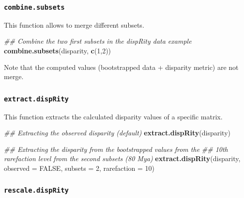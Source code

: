\documentclass[]{book}
\newenvironment{Shaded}{\begin{snugshade}}{\end{snugshade}}
\newcommand{\CommentTok}[1]{\textcolor[rgb]{0.56,0.35,0.01}{\textit{#1}}}
\newcommand{\DataTypeTok}[1]{\textcolor[rgb]{0.13,0.29,0.53}{#1}}
\newcommand{\DecValTok}[1]{\textcolor[rgb]{0.00,0.00,0.81}{#1}}
\newcommand{\KeywordTok}[1]{\textcolor[rgb]{0.13,0.29,0.53}{\textbf{#1}}}
\newcommand{\NormalTok}[1]{#1}
\newcommand{\OtherTok}[1]{\textcolor[rgb]{0.56,0.35,0.01}{#1}}
\begin{document}
\hypertarget{combine.subsets}{%
\subsubsection{\texorpdfstring{\texttt{combine.subsets}}{combine.subsets}}\label{combine.subsets}}

This function allows to merge different subsets.

\begin{Shaded}
\begin{Highlighting}[]
\CommentTok{## Combine the two first subsets in the dispRity data example}
\KeywordTok{combine.subsets}\NormalTok{(disparity, }\KeywordTok{c}\NormalTok{(}\DecValTok{1}\NormalTok{,}\DecValTok{2}\NormalTok{))}
\end{Highlighting}
\end{Shaded}

Note that the computed values (bootstrapped data + disparity metric) are not merge.

\hypertarget{extract.disprity}{%
\subsubsection{\texorpdfstring{\texttt{extract.dispRity}}{extract.dispRity}}\label{extract.disprity}}

This function extracts the calculated disparity values of a specific matrix.

\begin{Shaded}
\begin{Highlighting}[]
\CommentTok{## Extracting the observed disparity (default)}
\KeywordTok{extract.dispRity}\NormalTok{(disparity)}

\CommentTok{## Extracting the disparity from the bootstrapped values from the}
\CommentTok{## 10th rarefaction level from the second subsets (80 Mya)}
\KeywordTok{extract.dispRity}\NormalTok{(disparity, }\DataTypeTok{observed =} \OtherTok{FALSE}\NormalTok{, }\DataTypeTok{subsets =} \DecValTok{2}\NormalTok{, }\DataTypeTok{rarefaction =} \DecValTok{10}\NormalTok{)}
\end{Highlighting}
\end{Shaded}

\hypertarget{rescale.disprity}{%
\subsubsection{\texorpdfstring{\texttt{rescale.dispRity}}{rescale.dispRity}}\label{rescale.disprity}}
\end{document}
